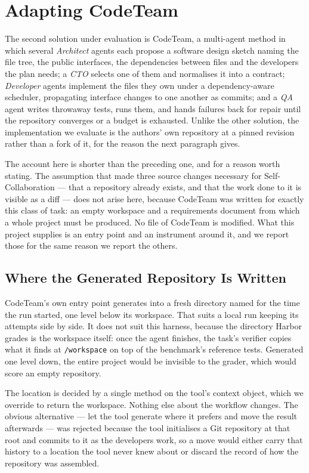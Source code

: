 \section{Adapting CodeTeam}

The second solution under evaluation is CodeTeam, a multi-agent method in which
several \emph{Architect} agents each propose a software design sketch naming the
file tree, the public interfaces, the dependencies between files and the
developers the plan needs; a \emph{CTO} selects one of them and normalises it
into a contract; \emph{Developer} agents implement the files they own under a
dependency-aware scheduler, propagating interface changes to one another as
commits; and a \emph{QA} agent writes throwaway tests, runs them, and hands
failures back for repair until the repository converges or a budget is
exhausted. Unlike the other solution, the implementation we evaluate is the
authors' own repository at a pinned revision rather than a fork of it, for the
reason the next paragraph gives.

The account here is shorter than the preceding one, and for a reason worth
stating. The assumption that made three source changes necessary for
Self-Collaboration --- that a repository already exists, and that the work done
to it is visible as a diff --- does not arise here, because CodeTeam was written
for exactly this class of task: an empty workspace and a requirements document
from which a whole project must be produced. No file of CodeTeam is modified.
What this project supplies is an entry point and an instrument around it, and we
report those for the same reason we report the others.

\subsection{Where the Generated Repository Is Written}

CodeTeam's own entry point generates into a fresh directory named for the time
the run started, one level below its workspace. That suits a local run keeping
its attempts side by side. It does not suit this harness, because the directory
Harbor grades is the workspace itself: once the agent finishes, the task's
verifier copies what it finds at \texttt{/workspace} on top of the benchmark's
reference tests. Generated one level down, the entire project would be invisible
to the grader, which would score an empty repository.

The location is decided by a single method on the tool's context object, which
we override to return the workspace. Nothing else about the workflow changes.
The obvious alternative --- let the tool generate where it prefers and move the
result afterwards --- was rejected because the tool initialises a Git repository
at that root and commits to it as the developers work, so a move would either
carry that history to a location the tool never knew about or discard the record
of how the repository was assembled.

